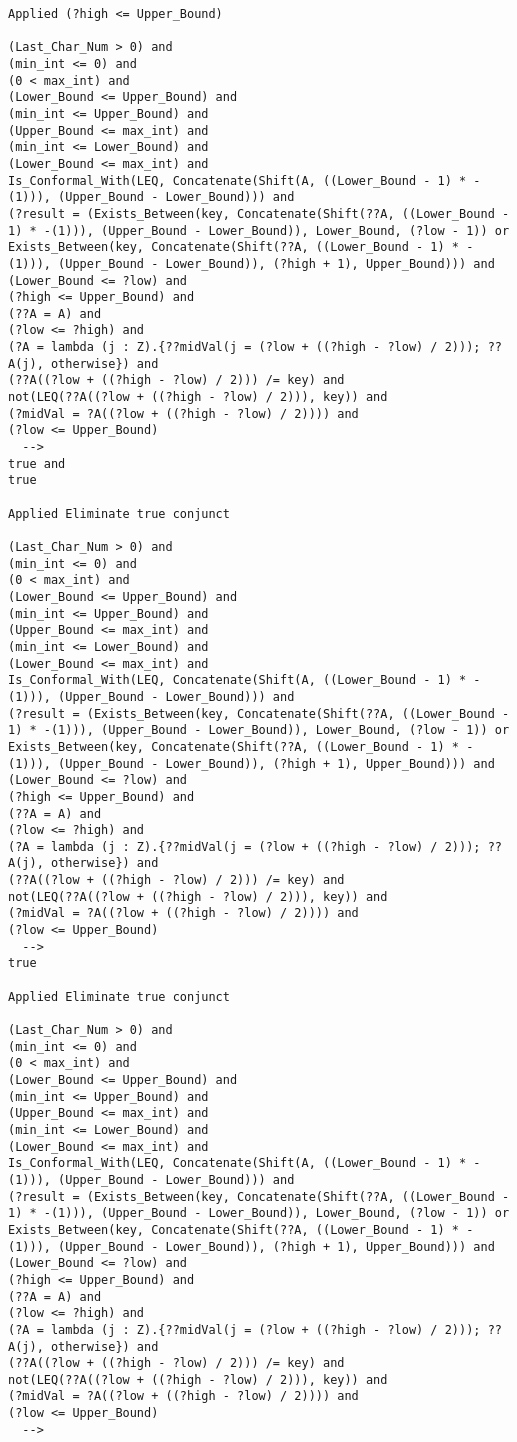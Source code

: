 \begin{lstlisting}[language=resolve]
Applied (?high <= Upper_Bound)

(Last_Char_Num > 0) and
(min_int <= 0) and
(0 < max_int) and
(Lower_Bound <= Upper_Bound) and
(min_int <= Upper_Bound) and
(Upper_Bound <= max_int) and
(min_int <= Lower_Bound) and
(Lower_Bound <= max_int) and
Is_Conformal_With(LEQ, Concatenate(Shift(A, ((Lower_Bound - 1) * -(1))), (Upper_Bound - Lower_Bound))) and
(?result = (Exists_Between(key, Concatenate(Shift(??A, ((Lower_Bound - 1) * -(1))), (Upper_Bound - Lower_Bound)), Lower_Bound, (?low - 1)) or Exists_Between(key, Concatenate(Shift(??A, ((Lower_Bound - 1) * -(1))), (Upper_Bound - Lower_Bound)), (?high + 1), Upper_Bound))) and
(Lower_Bound <= ?low) and
(?high <= Upper_Bound) and
(??A = A) and
(?low <= ?high) and
(?A = lambda (j : Z).{??midVal(j = (?low + ((?high - ?low) / 2))); ??A(j), otherwise}) and
(??A((?low + ((?high - ?low) / 2))) /= key) and
not(LEQ(??A((?low + ((?high - ?low) / 2))), key)) and
(?midVal = ?A((?low + ((?high - ?low) / 2)))) and
(?low <= Upper_Bound)
  -->
true and
true

Applied Eliminate true conjunct

(Last_Char_Num > 0) and
(min_int <= 0) and
(0 < max_int) and
(Lower_Bound <= Upper_Bound) and
(min_int <= Upper_Bound) and
(Upper_Bound <= max_int) and
(min_int <= Lower_Bound) and
(Lower_Bound <= max_int) and
Is_Conformal_With(LEQ, Concatenate(Shift(A, ((Lower_Bound - 1) * -(1))), (Upper_Bound - Lower_Bound))) and
(?result = (Exists_Between(key, Concatenate(Shift(??A, ((Lower_Bound - 1) * -(1))), (Upper_Bound - Lower_Bound)), Lower_Bound, (?low - 1)) or Exists_Between(key, Concatenate(Shift(??A, ((Lower_Bound - 1) * -(1))), (Upper_Bound - Lower_Bound)), (?high + 1), Upper_Bound))) and
(Lower_Bound <= ?low) and
(?high <= Upper_Bound) and
(??A = A) and
(?low <= ?high) and
(?A = lambda (j : Z).{??midVal(j = (?low + ((?high - ?low) / 2))); ??A(j), otherwise}) and
(??A((?low + ((?high - ?low) / 2))) /= key) and
not(LEQ(??A((?low + ((?high - ?low) / 2))), key)) and
(?midVal = ?A((?low + ((?high - ?low) / 2)))) and
(?low <= Upper_Bound)
  -->
true

Applied Eliminate true conjunct

(Last_Char_Num > 0) and
(min_int <= 0) and
(0 < max_int) and
(Lower_Bound <= Upper_Bound) and
(min_int <= Upper_Bound) and
(Upper_Bound <= max_int) and
(min_int <= Lower_Bound) and
(Lower_Bound <= max_int) and
Is_Conformal_With(LEQ, Concatenate(Shift(A, ((Lower_Bound - 1) * -(1))), (Upper_Bound - Lower_Bound))) and
(?result = (Exists_Between(key, Concatenate(Shift(??A, ((Lower_Bound - 1) * -(1))), (Upper_Bound - Lower_Bound)), Lower_Bound, (?low - 1)) or Exists_Between(key, Concatenate(Shift(??A, ((Lower_Bound - 1) * -(1))), (Upper_Bound - Lower_Bound)), (?high + 1), Upper_Bound))) and
(Lower_Bound <= ?low) and
(?high <= Upper_Bound) and
(??A = A) and
(?low <= ?high) and
(?A = lambda (j : Z).{??midVal(j = (?low + ((?high - ?low) / 2))); ??A(j), otherwise}) and
(??A((?low + ((?high - ?low) / 2))) /= key) and
not(LEQ(??A((?low + ((?high - ?low) / 2))), key)) and
(?midVal = ?A((?low + ((?high - ?low) / 2)))) and
(?low <= Upper_Bound)
  -->



\end{lstlisting}
